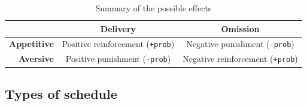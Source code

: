 \begin{table}[H]
    \centering
    \begin{tabular}{r|cc}
        \toprule
                            & \textbf{Delivery}                         & \textbf{Omission} \\
        \midrule
        \textbf{Appetitive} & Positive reinforcement (\texttt{+prob})   & Negative punishment (\texttt{-prob}) \\
        \textbf{Aversive}   & Positive punishment (\texttt{-prob})      & Negative reinforcement (\texttt{+prob}) \\
        \bottomrule
    \end{tabular}
    \caption{Summary of the possible effects}
\end{table}


\subsection{Types of schedule}

